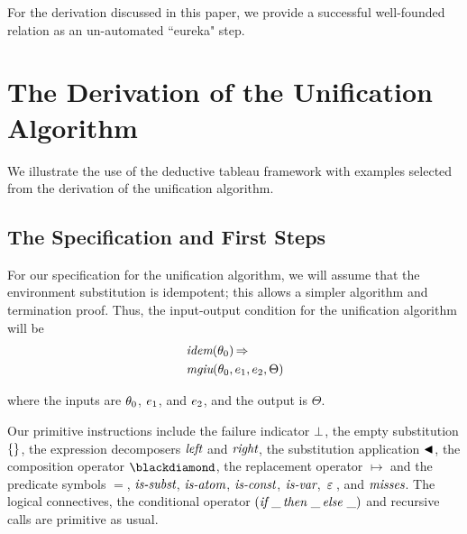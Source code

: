 \documentclass[runningheads]{llncs}
\DeclareMathOperator{\uimplies}{\Rightarrow}
\DeclareMathOperator{\uif}{\emph{if}\,}
\DeclareMathOperator{\uthen}{\emph{then}\,}
\DeclareMathOperator{\uelse}{\emph{else}\,}
\DeclareMathOperator{\isatm}{\emph{is-atom}}
\DeclareMathOperator{\iscnst}{\emph{is-const}}
\DeclareMathOperator{\isvar}{\emph{is-var}}
\DeclareMathOperator{\lef}{\emph{left}}
\DeclareMathOperator{\rig}{\emph{right}}
\DeclareMathOperator{\idem}{\emph{idem}}
\DeclareMathOperator{\mgiu}{\emph{mgiu}}
\begin{document}
For the derivation discussed in this paper, we provide a successful well-founded relation as an un-automated “eureka" step. 

\section{The Derivation of the Unification Algorithm}

We illustrate the use of the deductive tableau framework with examples selected from the derivation of the unification algorithm.


 
\subsection{The Specification and First Steps}\label{sec:spec-first}
  
For our specification for the unification algorithm, we will assume that the environment substitution is idempotent; this allows a simpler algorithm and termination proof. Thus,  the input-output condition for the unification algorithm will be
   \begin{align*}
       &\idem(\thet{0}) \uimplies \, \\
       &\,{\mgiu}(\thet{0}, \e{1}, \e{2}, \Theta)
   \end{align*}
   
   \noindent where the inputs are $\theta_{0}$, $e_{1}$, and $e_{2}$, and the output is $\Theta$. 

 

   Our primitive instructions include the failure indicator $\bot$, the empty substitution $\{\}$, the expression decomposers $\lef$ and $\rig$, the substitution application $\blacktriangleleft$, the composition operator $\compose$, the  replacement operator $\mapsto$ and the predicate symbols $=$, $\emph{is-subst}$, $\isatm$, $\iscnst$, $\isvar$, $\, \varepsilon \,$, and $\emph{misses}$.  The logical connectives, the conditional operator $(\uif\_\uthen \_\uelse\_)$ and recursive calls are primitive as usual.
\end{document}

